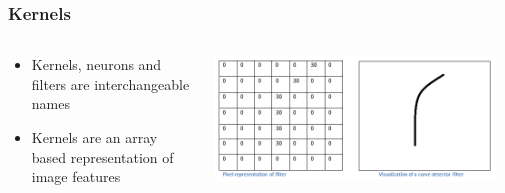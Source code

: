 \documentclass{beamer}
\begin{document}
\begin{frame}
  \frametitle{Kernels}
  
  \begin{columns}
  \begin{column}{0.6\textwidth}
  \begin{itemize}
	\item Kernels, neurons and filters are interchangeable names
	\item Kernels are an array based representation of image features
  \end{itemize}
  \end{column}
  \begin{column}{0.4\textwidth}
   \includegraphics[width=0.95\textwidth]{Filter.png}
       \\
  \end{column}
  \end{columns}
\end{frame}
\end{document}
